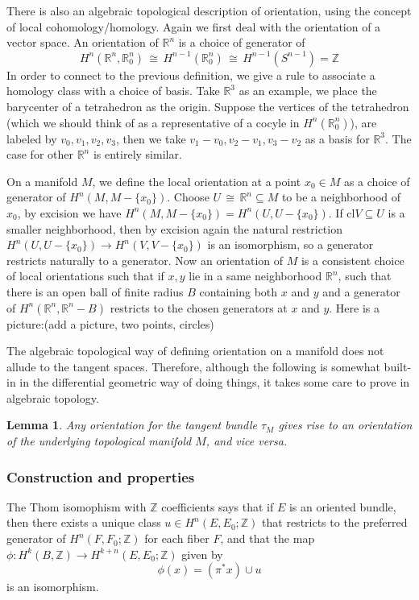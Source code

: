 \documentclass[12pt]{article}
\theoremstyle{plain}
\newtheorem{lemma}[equation]{Lemma}
\theoremstyle{definition}
\newcommand{\IR}{\mathbb{R}}
\newcommand{\IZ}{\mathbb{Z}}
\newcommand\iso{\,{\cong}\,}
\newcommand{\<}{\langle}
\renewcommand{\>}{\rangle}
\newcommand{\cl}{\mathrm{cl}}
\begin{document}
There is also an algebraic topological description of orientation, using the concept of local cohomology/homology. Again we first deal with the orientation of a vector space. An orientation of $\IR^n$ is a choice of generator of $$H^n(\IR^n, \IR^n_0) \iso H^{n-1}(\IR^n_0) \iso H^{n - 1}(S^{n - 1}) = \IZ$$
In order to connect to the previous definition, we give a rule to associate a homology class with a choice of basis. Take $\IR^3$ as an example, we place the barycenter of a tetrahedron as the origin. Suppose the vertices of the tetrahedron (which we should think of as a representative of a cocyle in $H^n(\IR^n_0)$), are labeled by $v_0, v_1, v_2, v_3$, then we take $v_1 - v_0, v_2 - v_1, v_3 - v_2$ as a basis for $\IR^3$. The case for other $\IR^n$ is entirely similar. 

On a manifold $M$, we define the local orientation at a point $x_0 \in M$ as a choice of generator of $H^n(M, M-\{x_0\})$. Choose $U \iso \IR^n \subseteq M$ to be a neighborhood of $x_0$, by excision we have $H^n(M, M-\{x_0\}) = H^n(U, U-\{x_0\})$. If $\cl{V} \subseteq U$ is a smaller neighborhood, then by excision again the natural restriction $H^n(U, U-\{x_0\}) \to H^n(V, V-\{x_0\})$ is an isomorphism, so a generator restricts naturally to a generator. Now an orientation of $M$ is a consistent choice of local orientations such that if $x, y$ lie in a same neighborhood $\IR^n$, such that there is an open ball of finite radius $B$ containing both $x$ and $y$ and a generator of $H^n(\IR^n, \IR^n - B)$ restricts to the chosen generators at $x$ and $y$. Here is a picture:(add a picture, two points, circles)

The algebraic topological way of defining orientation on a manifold does not allude to the tangent spaces. Therefore, although the following is somewhat built-in in the differential geometric way of doing things, it takes some care to prove in algebraic topology. 
\begin{lemma}
Any orientation for the tangent bundle $\tau_M$ gives rise to an orientation of the underlying topological manifold $M$, and vice versa. 
\end{lemma}

\subsubsection{Construction and properties}
The Thom isomophism with $\IZ$ coefficients says that if $E$ is an oriented bundle, then there exists a unique class $u \in H^n(E, E_0; \IZ)$ that restricts to the preferred generator of $H^n(F, F_0; \IZ)$ for each fiber $F$, and that the map $\phi : H^k(B, \IZ) \to H^{k + n}(E, E_0; \IZ)$ given by 
$$ \phi(x) = (\pi^* x) \cup u$$ is an isomorphism. 
\end{document}
